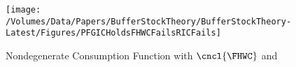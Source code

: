 \hypertarget{PFGICHoldsFHWCFailsRICFails}{}
\begin{figure}
\centerline{\texttt{[image: /Volumes/Data/Papers/BufferStockTheory/BufferStockTheory-Latest/Figures/PFGICHoldsFHWCFailsRICFails]}}
\caption{Nondegenerate Consumption Function with $\cncl{\FHWC}$ and \cncl{\RIC}}
\label{fig:PFGICHoldsFHWCFailsRICFails}
\end{figure}
